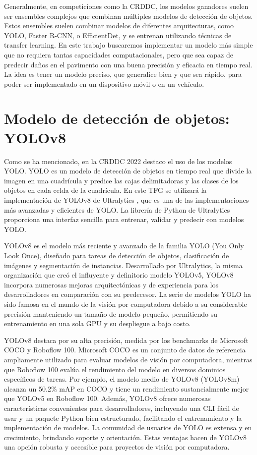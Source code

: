 Generalmente, en competiciones como la CRDDC, los modelos ganadores suelen ser ensembles complejos que combinan múltiples modelos de detección de objetos. Estos ensembles suelen combinar modelos de diferentes arquitecturas, como YOLO, Faster R-CNN, o EfficientDet, y se entrenan utilizando técnicas de transfer learning. En este trabajo buscaremos implementar un modelo más simple que no requiera tantas capacidades computacionales, pero que sea capaz de predecir daños en el pavimento con una buena precisión y eficacia en tiempo real. La idea es tener un modelo preciso, que generalice bien y que sea rápido, para poder ser implementado en un dispositivo móvil o en un vehículo.


\section{Modelo de detección de objetos: YOLOv8}
Como se ha mencionado, en la CRDDC 2022 destaco el uso de los modelos YOLO. YOLO \cite{YOLO} es un modelo de detección de objetos en tiempo real que divide la imagen en una cuadrícula y predice las cajas delimitadoras y las clases de los objetos en cada celda de la cuadrícula. En este TFG se utilizará la implementación de YOLOv8 de Ultralytics \cite{yolov8_ultralytics}, que es una de las implementaciones más avanzadas y eficientes de YOLO. La librería de Python de Ultralytics proporciona una interfaz sencilla para entrenar, validar y predecir con modelos YOLO.

YOLOv8 es el modelo más reciente y avanzado de la familia YOLO (You Only Look Once), diseñado para tareas de detección de objetos, clasificación de imágenes y segmentación de instancias. Desarrollado por Ultralytics, la misma organización que creó el influyente y definitorio modelo YOLOv5, YOLOv8 incorpora numerosas mejoras arquitectónicas y de experiencia para los desarrolladores en comparación con su predecesor. La serie de modelos YOLO ha sido famosa en el mundo de la visión por computadora debido a su considerable precisión manteniendo un tamaño de modelo pequeño, permitiendo su entrenamiento en una sola GPU y su despliegue a bajo costo.

YOLOv8 destaca por su alta precisión, medida por los benchmarks de Microsoft COCO y Roboflow 100. Microsoft COCO es un conjunto de datos de referencia ampliamente utilizado para evaluar modelos de visión por computadora, mientras que Roboflow 100 evalúa el rendimiento del modelo en diversos dominios específicos de tareas. Por ejemplo, el modelo medio de YOLOv8 (YOLOv8m) alcanza un 50.2\% mAP en COCO y tiene un rendimiento sustancialmente mejor que YOLOv5 en Roboflow 100. Además, YOLOv8 ofrece numerosas características convenientes para desarrolladores, incluyendo una CLI fácil de usar y un paquete Python bien estructurado, facilitando el entrenamiento y la implementación de modelos. La comunidad de usuarios de YOLO es extensa y en crecimiento, brindando soporte y orientación. Estas ventajas hacen de YOLOv8 una opción robusta y accesible para proyectos de visión por computadora.

